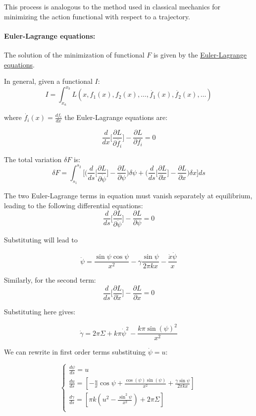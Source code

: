 \documentclass[12pt]{article}
\begin{document}
This process is analogous to the method used in classical mechanics for minimizing the action functional with respect to a trajectory.

\paragraph*{Euler-Lagrange equations:} 

The solution of the minimization of functional $F$ is given by the \href{https://en.wikipedia.org/wiki/Euler%E2%80%93Lagrange_equation}{Euler-Lagrange equations}. 

In general, given a functional $I$:
$$I=\int_{x_a}^{x_b}L(x,f_1(x),f_2(x),\dots,\dot{f_1}(x),\dot{f_2}(x),\dots)$$

where $\dot{f_i}(x)=\frac{df_i}{dx}$ the Euler-Lagrange equations are:

$$
\frac{d}{dx}\bigg[ \frac{\partial L}{\partial \dot{f_i}} \bigg] - \frac{\partial L}{\partial f_i} = 0
$$

The total variation $\delta F$ is:
 $$
 \delta F = \int_{s_1}^{s_2} \bigg[ \bigg(  \frac{d}{ds}\bigg[ \frac{\partial L}{\partial \dot{\psi}} \bigg] - \frac{\partial L}{\partial \psi} \bigg)\delta \psi + \bigg(  \frac{d}{ds}\bigg[ \frac{\partial L}{\partial \dot{x}} \bigg] - \frac{\partial L}{\partial x} \bigg)\delta x \bigg] ds 
 $$


The two Euler-Lagrange terms in equation must vanish separately at equilibrium, leading to the following differential equations:
 $$
 \frac{d}{ds}\bigg[ \frac{\partial L}{\partial \dot{\psi}} \bigg] - \frac{\partial L}{\partial \psi}  = 0
 $$

Substituting will lead to 

$$
\ddot{\psi} = \frac{\sin \psi \cos \psi}{x^2} - \gamma \frac{\sin \psi}{2 \pi k x} - \frac{\dot{x} \dot{\psi}}{x}
$$

Similarly, for the second term:
$$
\frac{d}{ds}\bigg[ \frac{\partial L}{\partial \dot{x}} \bigg] - \frac{\partial L}{\partial x} = 0
$$

Substituting here gives: 

$$
\dot{\gamma} = 2 \pi \Sigma + k \pi \dot{\psi}^2 - \frac{k \pi \sin(\psi)^2}{x^2}
$$

We can rewrite in first order terms substituing $\dot{\psi} =u$: 

\begin{equation}
  \begin{cases} 
    \frac{d\psi}{ds} =  u \\[3mm]
    \frac{du}{ds} =  [-\frac{u}{x}\cos\psi+\frac{\cos(\psi)\sin(\psi)}{x^2}+\frac{\gamma\sin \psi}{2\pi k x}] \\[3mm]
    \frac{d\gamma}{ds} =  [\pi k (u^2-\frac{\sin^2 \psi}{x^2})+2 \pi \Sigma] \\[3mm]
  \end{cases}
\end{equation}
\end{document}
